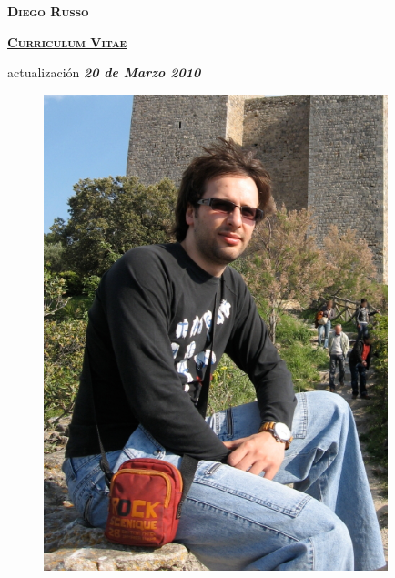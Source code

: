 \documentclass[totpages,helvetica,openbib,spanish]{europecv}
\begin{document}
    \begin{center}
        \hspace{1pt}
        \vspace{2cm}
    
        {\scshape \textbf{\Huge Diego Russo}}
    
        \vspace{1cm}
    
        {\scshape \textbf{\large \underline{Curriculum Vitae}}}
    
        \vspace{0.25cm}
    
        actualizaci\'on \emph{\textbf{20 de Marzo 2010}}
        
        \vspace{2cm}
        
        \begin{figure}[htbp] 
            \begin{center} 
                \includegraphics[width=10cm]{io.jpg}
            \end{center} 
        \end{figure}
        
    \end{center}
\pagebreak
{}
\end{document}
